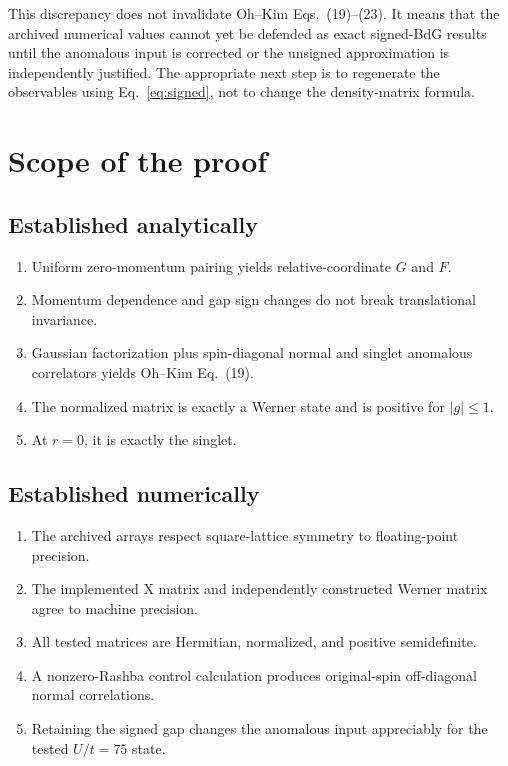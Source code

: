 \documentclass[11pt]{article}
\begin{document}
This discrepancy does not invalidate Oh--Kim Eqs.~(19)--(23). It means that the archived numerical values cannot yet be defended as exact signed-BdG results until the anomalous input is corrected or the unsigned approximation is independently justified. The appropriate next step is to regenerate the observables using Eq.~\eqref{eq:signed}, not to change the density-matrix formula.

\section{Scope of the proof}

\subsection*{Established analytically}
\begin{enumerate}
    \item Uniform zero-momentum pairing yields relative-coordinate $G$ and $F$.
    \item Momentum dependence and gap sign changes do not break translational invariance.
    \item Gaussian factorization plus spin-diagonal normal and singlet anomalous correlators yields Oh--Kim Eq.~(19).
    \item The normalized matrix is exactly a Werner state and is positive for $|g|\leq1$.
    \item At $r=0$, it is exactly the singlet.
\end{enumerate}

\subsection*{Established numerically}
\begin{enumerate}
    \item The archived arrays respect square-lattice symmetry to floating-point precision.
    \item The implemented X matrix and independently constructed Werner matrix agree to machine precision.
    \item All tested matrices are Hermitian, normalized, and positive semidefinite.
    \item A nonzero-Rashba control calculation produces original-spin off-diagonal normal correlations.
    \item Retaining the signed gap changes the anomalous input appreciably for the tested $U/t=75$ state.
\end{enumerate}
\end{document}
